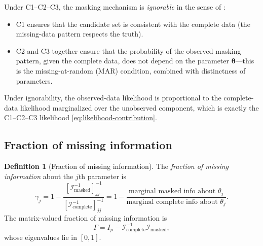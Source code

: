 \documentclass[11pt]{article}
\theoremstyle{definition}
\newtheorem{definition}{Definition}
\theoremstyle{plain}
\renewcommand{\v}[1]{\boldsymbol{#1}}
\newcommand{\btheta}{\v{\theta}}
\newcommand{\FI}{\mathcal{I}}       %
\begin{document}
Under C1--C2--C3, the masking mechanism is \emph{ignorable} in the
sense of \citet{little2002}:
\begin{itemize}[nosep]
    \item C1 ensures that the candidate set is consistent with the
    complete data (the missing-data pattern respects the truth).
    \item C2 and C3 together ensure that the probability of the
    observed masking pattern, given the complete data, does not depend
    on the parameter $\btheta$---this is the missing-at-random (MAR)
    condition, combined with distinctness of parameters.
\end{itemize}
Under ignorability, the observed-data likelihood is proportional to
the complete-data likelihood marginalized over the unobserved
component, which is exactly the C1--C2--C3 likelihood
\eqref{eq:likelihood-contribution}.

\subsection{Fraction of missing information}

\begin{definition}[Fraction of missing information]
\label{def:fmi}
The \emph{fraction of missing information} about the $j$th parameter
is
\begin{equation}
\label{eq:fmi}
    \gamma_j
    = 1 - \frac{[\FI_{\mathrm{masked}}^{-1}]_{jj}^{-1}}
               {[\FI_{\mathrm{complete}}^{-1}]_{jj}^{-1}}
    = 1 - \frac{\text{marginal masked info about } \theta_j}
               {\text{marginal complete info about } \theta_j}.
\end{equation}
The matrix-valued fraction of missing information is
\begin{equation}
    \Gamma = I_p - \FI_{\mathrm{complete}}^{-1} \FI_{\mathrm{masked}},
\end{equation}
whose eigenvalues lie in $[0, 1]$.
\end{definition}
\end{document}
